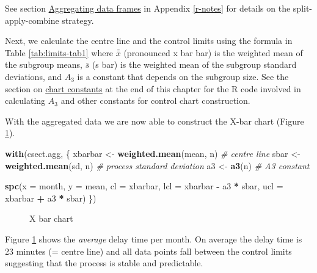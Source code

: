\documentclass[
]{book}
\makeatletter
\newenvironment{Shaded}{\begin{snugshade}}{\end{snugshade}}
\newcommand{\AttributeTok}[1]{\textcolor[rgb]{0.13,0.29,0.53}{#1}}
\newcommand{\CommentTok}[1]{\textcolor[rgb]{0.56,0.35,0.01}{\textit{#1}}}
\newcommand{\FunctionTok}[1]{\textcolor[rgb]{0.13,0.29,0.53}{\textbf{#1}}}
\newcommand{\NormalTok}[1]{#1}
\newcommand{\OtherTok}[1]{\textcolor[rgb]{0.56,0.35,0.01}{#1}}
\newcommand{\SpecialCharTok}[1]{\textcolor[rgb]{0.81,0.36,0.00}{\textbf{#1}}}
\newcommand*\pandocbounded[1]{%
  \sbox\pandoc@box{#1}%
  \Gscale@div\@tempa{\textheight}{\dimexpr\ht\pandoc@box+\dp\pandoc@box\relax}%
  \Gscale@div\@tempb{\linewidth}{\wd\pandoc@box}%
  \ifdim\@tempb\p@<\@tempa\p@\let\@tempa\@tempb\fi%
  \ifdim\@tempa\p@<\p@\scalebox{\@tempa}{\usebox\pandoc@box}%
  \else\usebox{\pandoc@box}%
  \fi%
}
\makeatother
\begin{document}
See section \hyperref[aggregating-data-frames]{Aggregating data frames} in Appendix \ref{r-notes} for details on the split-apply-combine strategy.

Next, we calculate the centre line and the control limits using the formula in Table \ref{tab:limits-tab1} where \(\bar{\bar{x}}\) (pronounced x bar bar) is the weighted mean of the subgroup means, \(\bar{s}\) (s bar) is the weighted mean of the subgroup standard deviations, and \(A_3\) is a constant that depends on the subgroup size. See the section on \hyperref[chart-constants]{chart constants} at the end of this chapter for the R code involved in calculating \(A_3\) and other constants for control chart construction.

With the aggregated data we are now able to construct the X-bar chart (Figure \ref{fig:limits-xbar}).

\begin{Shaded}
\begin{Highlighting}[]
\FunctionTok{with}\NormalTok{(csect.agg, \{}
\NormalTok{  xbarbar }\OtherTok{\textless{}{-}} \FunctionTok{weighted.mean}\NormalTok{(mean, n)  }\CommentTok{\# centre line}
\NormalTok{  sbar    }\OtherTok{\textless{}{-}} \FunctionTok{weighted.mean}\NormalTok{(sd, n)    }\CommentTok{\# process standard deviation}
\NormalTok{  a3      }\OtherTok{\textless{}{-}} \FunctionTok{a3}\NormalTok{(n)                   }\CommentTok{\# A3 constant}
  
  \FunctionTok{spc}\NormalTok{(}\AttributeTok{x   =}\NormalTok{ month,}
      \AttributeTok{y   =}\NormalTok{ mean,}
      \AttributeTok{cl  =}\NormalTok{ xbarbar,}
      \AttributeTok{lcl =}\NormalTok{ xbarbar }\SpecialCharTok{{-}}\NormalTok{ a3 }\SpecialCharTok{*}\NormalTok{ sbar,}
      \AttributeTok{ucl =}\NormalTok{ xbarbar }\SpecialCharTok{+}\NormalTok{ a3 }\SpecialCharTok{*}\NormalTok{ sbar)}
\NormalTok{\})}
\end{Highlighting}
\end{Shaded}

\begin{figure}
\centering
\pandocbounded{}
\caption{\label{fig:limits-xbar}X bar chart}
\end{figure}

Figure \ref{fig:limits-xbar} shows the \emph{average} delay time per month. On average the delay time is 23 minutes (= centre line) and all data points fall between the control limits suggesting that the process is stable and predictable.
\end{document}
